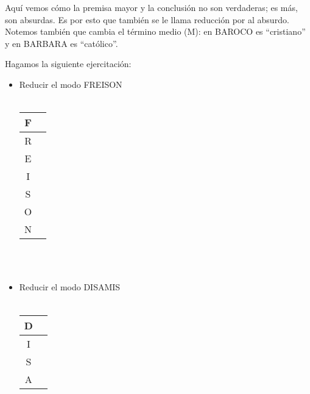 \documentclass{article}
\begin{document}
      Aquí vemos cómo la premisa mayor y la conclusión no son verdaderas; es más, son absurdas. Es por esto que también se le llama reducción por al absurdo. Notemos también que cambia el término medio (M): en BAROCO es ``cristiano'' y en BARBARA es ``católico''.
      \par Hagamos la siguiente ejercitación:
      
      \begin{itemize}
          \item Reducir el modo FREISON \\
          \\
          \begin{tabular}{|c|c|}
          \hline
               F & \hspace{35em} \\
               \hline
               R & \hspace{10em} \\
               \hline
               E & \hspace{10em} \\
               \hline
               I & \hspace{10em} \\
               \hline
               S & \hspace{10em} \\
               \hline
               O & \hspace{10em} \\
               \hline
               N & \hspace{10em} \\
          \hline
          \end{tabular}
         \\
         \\
         \item Reducir el modo DISAMIS \\
          \\
          \begin{tabular}{|c|c|}
          \hline
               D & \hspace{35em} \\
               \hline
               I & \hspace{10em} \\
               \hline
               S & \hspace{10em} \\
               \hline
               A & \hspace{10em} \\

\end{tabular}
\end{itemize}
\end{document}
